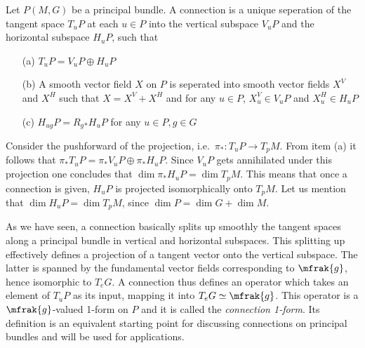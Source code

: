 \documentclass[10pt,reqno]{amsart}
\numberwithin{equation}{section}
\begin{document}
\begin{definition}[Connection]\label{def:connection1}
	Let $P(M,G)$ be a principal bundle. A connection is a unique 
	seperation of the tangent space $T_u P$ at each $u \in P$ into 
	the vertical subspace $V_u P$ and the horizontal subspace $H_u 
	P$, such that
	\begin{itemize}
		\item[(a)] $T_u P = V_u P \oplus H_u P$
		\item[(b)] A smooth vector field $X$ on $P$ is seperated into 
			smooth vector fields $X^V$ and $X^H$ such that $X = X^V + 
			X^H$ and for any $u \in P$, $X^V_u \in V_u P$ and $X^H_u 
			\in H_u P$
		\item[(c)] $H_{ug}P = R_g{}_\ast H_u P$ for any $u \in P, g 
			\in G$
	\end{itemize}
\end{definition}
%
Consider the pushforward of the projection, i.e.\ $\pi_\ast : T_u 
P \rightarrow T_p M$. From item (a) it follows that $\pi_\ast 
T_uP = \pi_\ast V_uP \oplus \pi_\ast H_uP$. Since $V_uP$ gets 
annihilated under this projection one concludes that $\dim 
\pi_\ast H_uP = \dim T_pM$. This means that once a connection is 
given, $H_uP$ is projected isomorphically onto $T_pM$. Let us 
mention that $\dim H_uP = \dim T_pM$, since $\dim P = \dim G + 
\dim M$.

\blankline
As we have seen, a connection basically splits up smoothly the 
tangent spaces along a principal bundle in vertical and 
horizontal subspaces. This splitting up effectively defines a 
projection of a tangent vector onto the vertical subspace. The 
latter is spanned by the fundamental vector fields corresponding 
to $\mfrak{g}$, hence isomorphic to $T_e G$. A connection thus 
defines an operator which takes an element of $T_uP$ as its  
input, mapping it into $T_e G \simeq \mfrak{g}$. This operator is 
a $\mfrak{g}$-valued 1-form on $P$ and it is called the 
\emph{connection 1-form}. Its definition is an equivalent 
starting point for discussing connections on principal bundles 
and will be used for applications.
\end{document}
